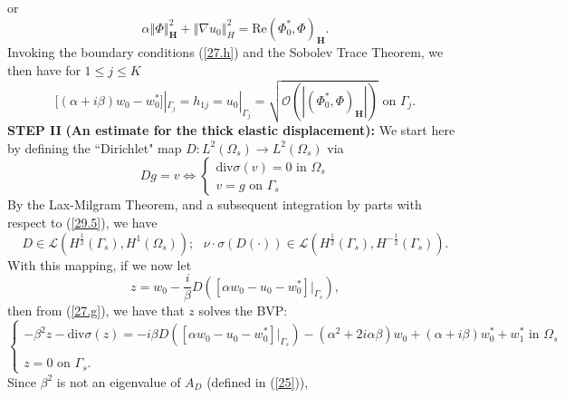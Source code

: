 \documentclass[11pt]{article}
\begin{document}
or%
\begin{equation}
\alpha \left\Vert \Phi \right\Vert _{\mathbf{H}}^{2}+\left\Vert \nabla
u_{0}\right\Vert _{H}^{2}=\text{Re}(\Phi _{0}^{\ast },\Phi )_{\mathbf{H}}.
\label{28}
\end{equation}%
Invoking the boundary conditions (\ref{27.h}) and the Sobolev Trace Theorem,
we then have for $1\leq j\leq K$ 
\begin{equation}
\lbrack (\alpha +i\beta )w_{0}-w_{0}^{\ast }]|_{\Gamma
_{j}}=h_{1j}=u_{0}|_{\Gamma _{j}}=\sqrt {\mathcal{O}\left( \left\vert (\Phi
_{0}^{\ast },\Phi )_{\mathbf{H}}\right\vert \right)} \text{ \ on \ }\Gamma
_{j}.  \label{29}
\end{equation}%
\newline
\textbf{STEP II} \textbf{(An estimate for the thick elastic displacement):} We start
here by defining the ``Dirichlet" map $D:L^{2}(\Omega _{s})\rightarrow
L^{2}(\Omega _{s})$ via%
\begin{equation}
Dg=v\Longleftrightarrow \left\{ 
\begin{array}{c}
\text{div}\sigma (v)=0\text{ \ \ in \ }\Omega _{s} \\ 
v=g\text{ \ \ on \ }\Gamma _{s}%
\end{array}%
\right.   \label{29.5}
\end{equation}%
By the Lax-Milgram Theorem, and a subsequent integration by parts with respect to (\ref{29.5}), we have%
\begin{equation}
D\in \mathcal{L}(H^{\frac{1}{2}}(\Gamma _{s}),H^{1}(\Omega _{s})); \text{ \ \ \ \ \ } \nu \cdot \sigma(D(\cdot))\in \mathcal{L}(H^{\frac{1}{2}}(\Gamma _{s}),H^{-\frac{1}{2}}(\Gamma _{s})).
\label{29.6}
\end{equation}%
With this mapping, if we now let 
\begin{equation}
z=w_{0}-\frac{i}{\beta }D([\alpha w_{0}-u_{0}-w_{0}^{\ast }]|_{\Gamma _{s}}),
\label{29.7}
\end{equation}%
then from (\ref{27.g}), we have that $z$ solves the BVP:%
\[
\left\{ 
\begin{array}{c}
-\beta ^{2}z-\text{div}\sigma (z)=-i\beta D([\alpha w_{0}-u_{0}-w_{0}^{\ast
}]|_{\Gamma _{s}})-(\alpha ^{2}+2i\alpha \beta )w_{0}+(\alpha +i\beta )w_{0}^{\ast
}+w_{1}^{\ast }\text{ \ \ in }\Omega _{s} \\ 
 \\
z=0\text{ \ \ \ on \ }\Gamma _{s}.\text{\ }%
\end{array}%
\right. 
\]%
Since $\beta ^{2}$ is not an eigenvalue of $A_{D}$ (defined in (\ref{25})),
\end{document}
